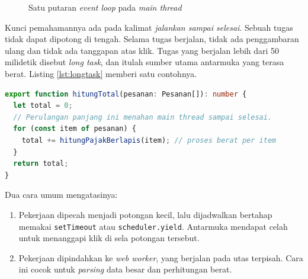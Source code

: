 \begin{figure}[ht]
  \centering
  \caption{Satu putaran \textit{event loop} pada \textit{main thread}}
  \label{fig:event-loop}
\end{figure}

Kunci pemahamannya ada pada kalimat \emph{jalankan sampai selesai}. Sebuah
tugas tidak dapat dipotong di tengah. Selama tugas berjalan, tidak ada
penggambaran ulang dan tidak ada tanggapan atas klik. Tugas yang berjalan lebih
dari 50 milidetik disebut \textit{long task}, dan itulah sumber utama
antarmuka yang terasa berat. Listing \ref{lst:longtask} memberi satu
contohnya.

\begin{lstlisting}[language=TypeScript, caption={Tugas berat yang menahan seluruh antarmuka, tersedia di \berkas{sources/chapter02/tugas-berat.ts}}, label={lst:longtask}]
export function hitungTotal(pesanan: Pesanan[]): number {
  let total = 0;
  // Perulangan panjang ini menahan main thread sampai selesai.
  for (const item of pesanan) {
    total += hitungPajakBerlapis(item); // proses berat per item
  }
  return total;
}
\end{lstlisting}

Dua cara umum mengatasinya:

\begin{enumerate}
  \item Pekerjaan dipecah menjadi potongan kecil, lalu dijadwalkan bertahap
        memakai \texttt{setTimeout} atau \texttt{scheduler.yield}. Antarmuka
        mendapat celah untuk menanggapi klik di sela potongan tersebut.
  \item Pekerjaan dipindahkan ke \textit{web worker}, yang berjalan pada utas
        terpisah. Cara ini cocok untuk \textit{parsing} data besar dan perhitungan
        berat.
\end{enumerate}

